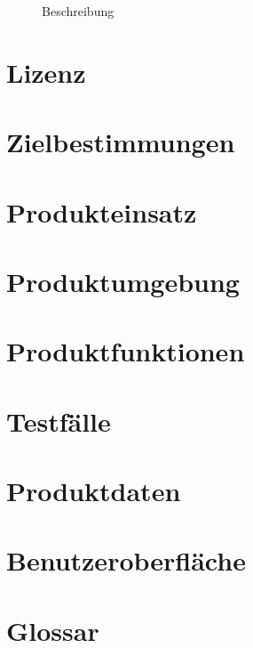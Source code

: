 \documentclass{report}
\begin{document}
	
	\begin{figure}[h]
		\centering
		\caption{Beschreibung}
		\label{fig:x}
	\end{figure}
		
	
	\tableofcontents
	
	\chapter{Lizenz}\label{chp:lizenz}
	
	
	\chapter{Zielbestimmungen}\label{chp:zielbestimmungen}
	
	
	\chapter{Produkteinsatz}\label{chp:produkteinsatz}
	
		
	\chapter{Produktumgebung}\label{chp:produktumgebung}
	
	

	\chapter{Produktfunktionen}\label{chp:produktfunktionen}
	

	\chapter{Testfälle}\label{chp:testfaelle}
	
	
	\chapter{Produktdaten}\label{chp:produktdaten}
	
	
	\chapter{Benutzeroberfläche}\label{chp:benutzeroberflaeche}
	
	
	\chapter{Glossar}\label{chp:glossar}
	
	
	
	
\end{document}
